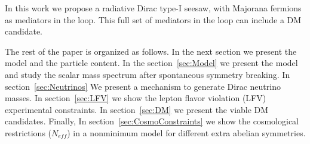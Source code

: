 \documentclass[12pt]{article}
\begin{document}
In this work we propose a radiative Dirac type-I seesaw, with Majorana
fermions as mediators in the loop. This full set of mediators in the
loop can include a DM candidate.

The rest of the paper is organized as follows. In the next section we present the model and the particle content. In the section~\ref{sec:Model} we present the model and study the scalar mass spectrum after spontaneous symmetry breaking. In section~\ref{sec:Neutrinos} We present a mechanism to generate Dirac neutrino masses. In section~\ref{sec:LFV} we show the lepton flavor violation (LFV) experimental  constraints. In section~\ref{sec:DM} we present the viable DM candidates. Finally, In section~\ref{sec:CosmoConstraints} we show the cosmological restrictions ($N_{eff}$) in a nonminimum model for different extra abelian symmetries.
\end{document}
